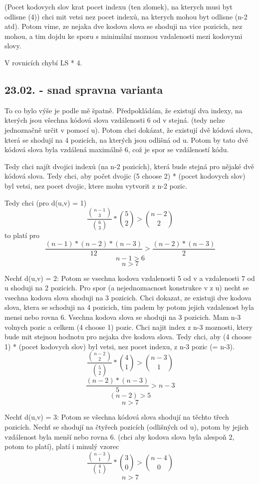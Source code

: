 (Pocet kodovych slov krat pocet indexu (ten zlomek), na kterych musi byt odlisne (4)) chci mit vetsi nez pocet indexů, na kterych mohou byt odlisne (n-2 atd). Potom vime, ze nejaka dve kodova slova se shoduji na vice pozicich, nez mohou, a tim dojdu ke sporu s minimální moznou vzdalenosti mezi kodovymi slovy. 

V rovnicích chybí LS * 4.

\subsection{23.02. - snad spravna varianta}
To co bylo výše je podle mě špatně. Předpokládám, že existují dva indexy, na kterých jsou všechna kódová slova vzdálenosti 6 od v stejná. (tedy nelze jednoznačně určit v pomocí u). Potom chci dokázat, že existují dvě kódová slova, která se shodují na 4 pozicích, na kterých jsou odlišná od u. Potom by tato dvě kódová slova byla vzdálená maximálně 6, což je spor se vzdáleností kódu. 

Tedy chci najít dvojici indexů (na n-2 pozicích), která bude stejná pro nějaké dvě kódová slova. Tedy chci, aby počet dvojic (5 choose 2) * (pocet kodovych slov) byl vetsi, nez pocet dvojic, ktere mohu vytvorit z n-2 pozic. 

Tedy chci (pro d(u,v) = 1)
\[ \frac{\binom{n-1}{3}}{\binom{6}{3}} * \binom{5}{2} > \binom{n-2}{2} \]
to platí pro
\[\frac{(n-1)*(n-2)*(n-3)}{12} > \frac{(n-2)*(n-3)}{2}\]
\[n-1 > 6\]
\[n > 7\]

Nechť d(u,v) = 2:
Potom se vsechna kodova vzdalenosti 5 od v a vzdalenosti 7 od u shoduji na 2 pozicich. Pro spor (a nejednoznacnost konstrukce v z u) necht se vsechna kodova slova shoduji na 3 pozicich. Chci dokazat, ze existuji dve kodova slova, ktera se schoduji na 4 pozicich, tim padem by potom jejich vzdalenost byla mensi nebo rovna 6. Vsechna kodova slova se shoduji na 3 pozicich. Mam n-3 volnych pozic a celkem (4 choose 1) pozic. Chci najit index z n-3 moznosti, ktery bude mit stejnou hodnotu pro nejaka dve kodova slova. Tedy chci, aby (4 choose 1) * (pocet kodovych slov) byl vetsi, nez pocet indexu, z n-3 pozic (= n-3).
\[ \frac{\binom{n-2}{2}}{\binom{5}{2}} * \binom{4}{1} > \binom{n-3}{1} \]
\[ \frac{(n-2)*(n-3)}{5} > n-3 \]
\[ (n-2) > 5 \]
\[n > 7\]

Nechť d(u,v) = 3:
Potom se všechna kódová slova shodují na těchto třech pozicích. Nechť se shodují na čtyřech pozicích (odlišných od u), potom by jejich vzdálenost byla menší nebo rovna 6. (chci aby kodova slova byla alespoň 2, potom to platí), platí i minulý vzorec
\[ \frac{\binom{n-3}{1}}{\binom{4}{1}} * \binom{3}{0} > \binom{n-4}{0} \]
\[n > 7\]

